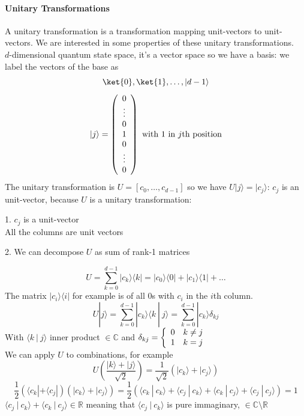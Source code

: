 \documentclass[10pt]{report}
\begin{document}
\paragraph{Unitary Transformations} A unitary transformation is a transformation mapping unit-vectors to unit-vectors. We are interested in some properties of these unitary transformations.\\
$d$-dimensional quantum state space, it's a vector space so we have a basis: we label the vectors of the base as $$\ket{0}, \ket{1},\ldots,|d-1\rangle$$
$$|j\rangle = \left(\begin{array}{c}
0\\\vdots\\0\\1\\0\\\vdots\\0
\end{array}\right)\hbox{ with }1\hbox{ in }j\hbox{th position}$$
The unitary transformation is $U = [c_0,\ldots,c_{d-1}]$ so we have $U|j\rangle = |c_j\rangle$: $c_j$ is an unit-vector, because $U$ is a unitary transformation:
\begin{list}{}{}
	\item[1.] $c_j$ is a unit-vector\\All the columns are unit vectors
	\item[2.] We can decompose $U$ as sum of rank-1 matrices
\end{list}
$$U=\sum_{k=0}^{d-1}|c_k\rangle\langle k| = |c_0\rangle\langle 0| + |c_1\rangle\langle 1| + \ldots$$
The matrix $|c_i\rangle\langle i|$ for example is of all 0s with $c_i$ in the $i$th column. $$U|j\rangle = \sum_{k=0}^{d-1}|c_k\rangle\langle k\:|\:j\rangle = \sum_{k=0}^{d-1} |c_k\rangle\delta_{kj}$$
With $\langle k\:|\:j\rangle$ inner product $\in \mathbb{C}$ and $\delta_{kj} = \left\{\begin{array}{l l}
0&k\neq j\\
1&k = j
\end{array}\right.$\\
We can apply $U$ to combinations, for example $$U\left(\frac{|k\rangle + |j\rangle}{\sqrt{2}}\right) = \frac{1}{\sqrt{2}}(|c_k\rangle + |c_j\rangle)$$
$$\frac{1}{2}(\langle c_k|+\langle c_j|)(|c_k\rangle + |c_j\rangle) = \frac{1}{2}\left(\langle c_k\:|\:c_k\rangle + \langle c_j\:|\:c_k\rangle + \langle c_k\:|\:c_j\rangle + \langle c_j\:|\:c_j\rangle\right)=1$$
$\langle c_j\:|\:c_k\rangle + \langle c_k\:|\:c_j\rangle \in \mathbb{R}$ meaning that $\langle c_j\:|\:c_k\rangle$ is pure immaginary, $\in \mathbb{C}\setminus \mathbb{R}$\\\\
\end{document}
